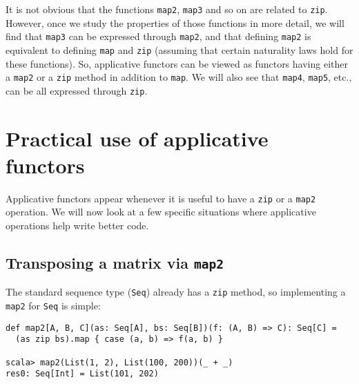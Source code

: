 It is not obvious that the functions \lstinline!map2!, \lstinline!map3!
and so on are related to \lstinline!zip!. However, once we study
the properties of those functions in more detail, we will find that
\lstinline!map3! can be expressed through \lstinline!map2!, and
that defining \lstinline!map2! is equivalent to defining \lstinline!map!
and \lstinline!zip! (assuming that certain naturality laws hold for
these functions). So, applicative functors can be viewed as functors
having either a \lstinline!map2! or a \lstinline!zip! method in
addition to \lstinline!map!. We will also see that \lstinline!map4!,
\lstinline!map5!, etc., can be all expressed through \lstinline!zip!.

\section{Practical use of applicative functors}

Applicative functors appear whenever it is useful to have a \lstinline!zip!
or a \lstinline!map2! operation. We will now look at a few specific
situations where applicative operations help write better code.

\subsection{Transposing a matrix via \texttt{map2}}

The standard sequence type (\lstinline!Seq!) already has a \lstinline!zip!
method, so implementing a \lstinline!map2! for \lstinline!Seq! is
simple:
\begin{lstlisting}
def map2[A, B, C](as: Seq[A], bs: Seq[B])(f: (A, B) => C): Seq[C] =
  (as zip bs).map { case (a, b) => f(a, b) }

scala> map2(List(1, 2), List(100, 200))(_ + _)
res0: Seq[Int] = List(101, 202)
\end{lstlisting}

